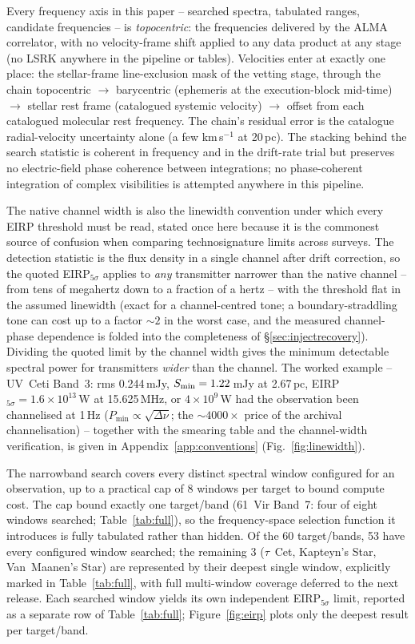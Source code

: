 \documentclass{openjournal}
\begin{document}
Every frequency axis in this paper -- searched spectra, tabulated
ranges, candidate frequencies -- is \emph{topocentric}: the
frequencies delivered by the ALMA correlator, with no velocity-frame
shift applied to any data product at any stage (no LSRK anywhere in
the pipeline or tables). Velocities enter at exactly one place: the
stellar-frame line-exclusion mask of the vetting stage, through the
chain topocentric $\rightarrow$ barycentric (ephemeris at the
execution-block mid-time) $\rightarrow$ stellar rest frame
(catalogued systemic velocity) $\rightarrow$ offset from each
catalogued molecular rest frequency. The chain's residual error is
the catalogue radial-velocity uncertainty alone (a few
km\,s$^{-1}$ at 20\,pc). The stacking behind the search statistic is
coherent in frequency and in the drift-rate trial but preserves no
electric-field phase coherence between integrations; no
phase-coherent integration of complex visibilities is attempted
anywhere in this pipeline.

The native channel width is also the linewidth convention under which
every EIRP threshold must be read, stated once here because it is the
commonest source of confusion when comparing technosignature limits
across surveys. The detection statistic is the flux density in a
single channel after drift correction, so the quoted
EIRP$_{5\sigma}$ applies to \emph{any} transmitter narrower than the
native channel -- from tens of megahertz down to a fraction of a
hertz -- with the threshold flat in the assumed linewidth (exact for
a channel-centred tone; a boundary-straddling tone can cost up to a
factor ${\sim}2$ in the worst case, and the measured channel-phase
dependence is folded into the completeness of
\S\ref{sec:injectrecovery}). Dividing the quoted limit by the channel
width gives the minimum detectable spectral power for transmitters
\emph{wider} than the channel. The worked example -- UV~Ceti Band~3:
rms 0.244\,mJy, $S_{\rm min}=1.22$\,mJy at 2.67\,pc,
EIRP$_{5\sigma}=1.6\times10^{13}$\,W at 15.625\,MHz, or
$4\times10^{9}$\,W had the observation been channelised at 1\,Hz
($P_{\min}\propto\sqrt{\Delta\nu}$; the ${\sim}4000\times$ price of
the archival channelisation) -- together with the smearing table and
the channel-width verification, is given in
Appendix~\ref{app:conventions} (Fig.~\ref{fig:linewidth}).

The narrowband search covers every distinct spectral window
configured for an observation, up to a practical cap of 8 windows per
target to bound compute cost. The cap bound exactly one target/band
(61~Vir Band~7: four of eight windows searched;
Table~\ref{tab:full}), so the frequency-space selection function it
introduces is fully tabulated rather than hidden. Of the 60
target/bands, 53 have every configured window searched; the remaining
3 ($\tau$~Cet, Kapteyn's Star, Van~Maanen's Star) are represented by
their deepest single window, explicitly marked in Table~\ref{tab:full},
with full multi-window coverage deferred to the next release. Each
searched window yields its own independent EIRP$_{5\sigma}$ limit,
reported as a separate row of Table~\ref{tab:full};
Figure~\ref{fig:eirp} plots only the deepest result per target/band.
\end{document}
